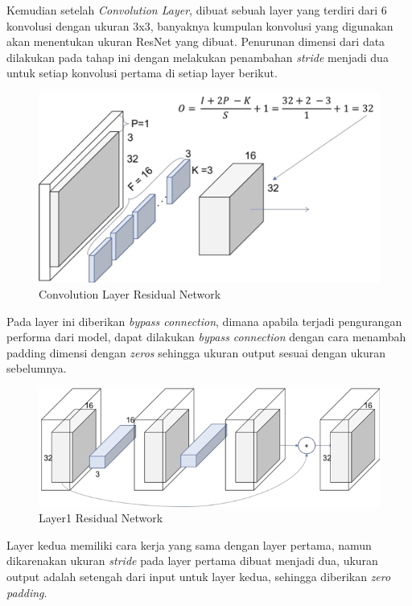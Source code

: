 Kemudian setelah \textit{Convolution Layer}, dibuat sebuah layer yang terdiri dari 6 konvolusi dengan ukuran 3x3, banyaknya kumpulan konvolusi yang digunakan akan menentukan ukuran ResNet yang dibuat. Penurunan dimensi dari data dilakukan pada tahap ini dengan melakukan penambahan \textit{stride} menjadi dua untuk setiap konvolusi pertama di setiap layer berikut. 

\begin{figure}[h!]
	\centering
	\includegraphics[scale=0.35]{img/convlightresnet.png}
	\caption{Convolution Layer Residual Network}
	\label{fig:Resnetconv}
\end{figure}

Pada layer ini diberikan \textit{bypass connection}, dimana apabila terjadi pengurangan performa dari model, dapat dilakukan \textit{bypass connection} dengan cara menambah padding dimensi dengan \textit{zeros} sehingga ukuran output sesuai dengan ukuran sebelumnya.

\begin{figure}[h!]
	\centering
	\includegraphics[scale=0.3]{img/layer1.png}
	\caption{Layer1 Residual Network}
	\label{fig:ResnetLayer1}
\end{figure}

Layer kedua memiliki cara kerja yang sama dengan layer pertama, namun dikarenakan ukuran \textit{stride} pada layer pertama dibuat menjadi dua, ukuran output adalah setengah dari input untuk layer kedua, sehingga diberikan \textit{zero padding}.


